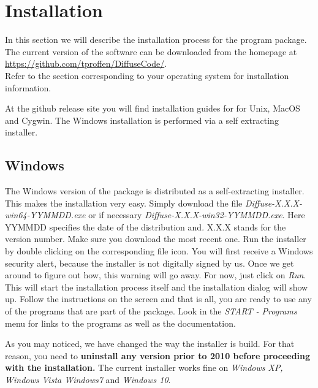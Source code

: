 
\chapter{Installation \label{app-install}}

In this section we will describe the installation process
for the \Discus program package. 
The current version of the
software can be downloaded from the \Discus homepage at \\
\url{
https://github.com/tproffen/DiffuseCode/}. \\
Refer to the section corresponding
to your operating system for installation information.

At the github release site you will find installation guides for
\Discus for Unix, MacOS and Cygwin.  The Windows installation is performed
via a self extracting installer.

\section{Windows \label{appa-bwin}}

The Windows version of the \Discus package is distributed as a
self-extracting installer. This makes the installation very easy.
Simply download the file {\it Diffuse-X.X.X-win64-YYMMDD.exe} or
if necessary {\it Diffuse-X.X.X-win32-YYMMDD.exe}. Here YYMMDD
specifies the date of the distribution and. X.X.X stands for the 
version number. Make sure you download the
most recent one.  Run the installer by double clicking on the
corresponding file icon. You will first receive a Windows security
alert, %
because the installer is not digitally 
signed by us. Once we get around to figure out how, this warning will go 
away. For now, just click on {\it Run}. This will start the installation 
process itself and the installation dialog will show up. %
Follow the instructions on the screen and that is all, you are ready to use
any of the programs that are part of the \Discus package. Look
in the {\it START - Programs} menu for links to the programs as well
as the documentation.

As you may noticed, we have changed the way the installer is build. For 
that reason, you need to \textbf{uninstall any \Discus version prior to
2010 before proceeding with the installation.} The current installer 
works fine on \textit{Windows XP, Windows Vista Windows7} and 
\textit{Windows 10}. 

